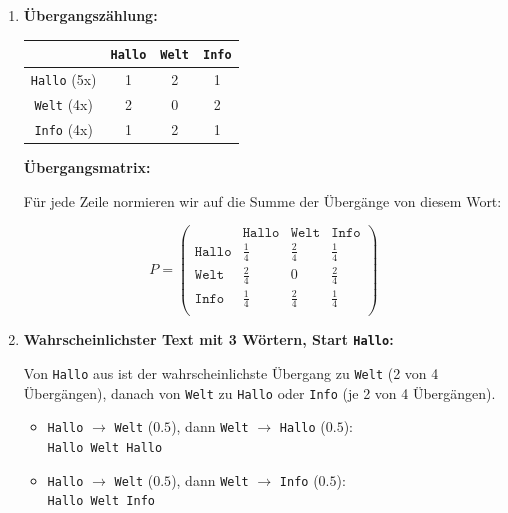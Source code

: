 \begin{frame}
    \begin{enumerate}
        \item \textbf{Übergangszählung:}
              \begin{table}[H]
                  \centering
                  \begin{tabular}{c|ccc}
                                          & \texttt{Hallo} & \texttt{Welt} & \texttt{Info} \\
                      \hline
                      \texttt{Hallo} (5x) & 1              & 2             & 1             \\
                      \texttt{Welt} (4x)  & 2              & 0             & 2             \\
                      \texttt{Info} (4x)  & 1              & 2             & 1             \\
                  \end{tabular}
              \end{table}

              \textbf{Übergangsmatrix:}

              Für jede Zeile normieren wir auf die Summe der Übergänge von diesem Wort:

              \[
                  P = \begin{pmatrix}
                                     & \texttt{Hallo} & \texttt{Welt} & \texttt{Info} \\
                      \texttt{Hallo} & \frac{1}{4}    & \frac{2}{4}   & \frac{1}{4}   \\
                      \texttt{Welt}  & \frac{2}{4}    & 0             & \frac{2}{4}   \\
                      \texttt{Info}  & \frac{1}{4}    & \frac{2}{4}   & \frac{1}{4}   \\
                  \end{pmatrix}
              \]

        \item \textbf{Wahrscheinlichster Text mit 3 Wörtern, Start \texttt{Hallo}:}

              Von \texttt{Hallo} aus ist der wahrscheinlichste Übergang zu \texttt{Welt} (2 von 4 Übergängen), danach von \texttt{Welt} zu \texttt{Hallo} oder \texttt{Info} (je 2 von 4 Übergängen).

              \begin{itemize}
                  \item \texttt{Hallo} $\rightarrow$ \texttt{Welt} ($0.5$), dann \texttt{Welt} $\rightarrow$ \texttt{Hallo} ($0.5$):\\
                        \texttt{Hallo Welt Hallo}
                  \item \texttt{Hallo} $\rightarrow$ \texttt{Welt} ($0.5$), dann \texttt{Welt} $\rightarrow$ \texttt{Info} ($0.5$):\\
                        \texttt{Hallo Welt Info}
              \end{itemize}


\end{enumerate}
\end{frame}
